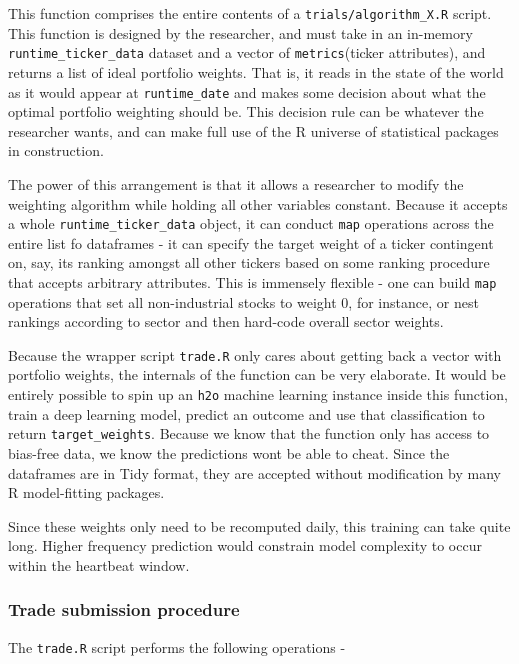 \documentclass[11pt,preprint, authoryear]{elsarticle}
\numberwithin{equation}{section}
\numberwithin{figure}{section}
\numberwithin{table}{section}
\begin{document}
This function comprises the entire contents of a
\texttt{trials/algorithm\_X.R} script. This function is designed by the
researcher, and must take in an in-memory \texttt{runtime\_ticker\_data}
dataset and a vector of \texttt{metrics}(ticker attributes), and returns
a list of ideal portfolio weights. That is, it reads in the state of the
world as it would appear at \texttt{runtime\_date} and makes some
decision about what the optimal portfolio weighting should be. This
decision rule can be whatever the researcher wants, and can make full
use of the R universe of statistical packages in construction.

The power of this arrangement is that it allows a researcher to modify
the weighting algorithm while holding all other variables constant.
Because it accepts a whole \texttt{runtime\_ticker\_data} object, it can
conduct \texttt{map} operations across the entire list fo dataframes -
it can specify the target weight of a ticker contingent on, say, its
ranking amongst all other tickers based on some ranking procedure that
accepts arbitrary attributes. This is immensely flexible - one can build
\texttt{map} operations that set all non-industrial stocks to weight 0,
for instance, or nest rankings according to sector and then hard-code
overall sector weights.

Because the wrapper script \texttt{trade.R} only cares about getting
back a vector with portfolio weights, the internals of the function can
be very elaborate. It would be entirely possible to spin up an
\texttt{h2o} machine learning instance inside this function, train a
deep learning model, predict an outcome and use that classification to
return \texttt{target\_weights}. Because we know that the function only
has access to bias-free data, we know the predictions wont be able to
cheat. Since the dataframes are in Tidy format, they are accepted
without modification by many R model-fitting packages.

Since these weights only need to be recomputed daily, this training can
take quite long. Higher frequency prediction would constrain model
complexity to occur within the heartbeat window.

\subsubsection{Trade submission
procedure}\label{trade-submission-procedure}

The \texttt{trade.R} script performs the following operations -
\end{document}
